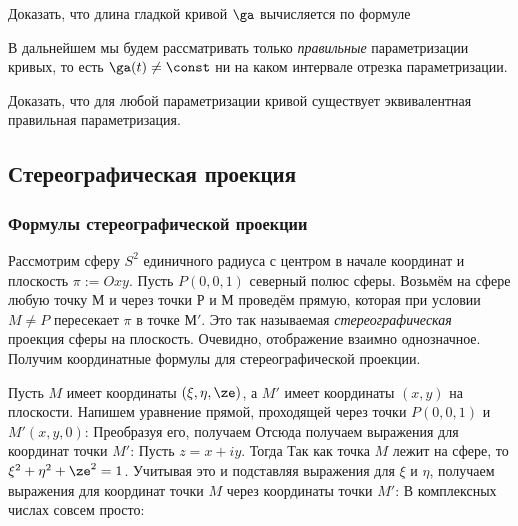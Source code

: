 \documentclass[a4paper]{article}
\begin{document}
\begin{problem}
Доказать, что длина гладкой кривой $\ga$ вычисляется по формуле
\end{problem}

\begin{note}
В дальнейшем мы будем рассматривать только \emph{правильные} параметризации кривых, то есть $\ga(t)\neq\const$ ни на
каком интервале отрезка параметризации.
\end{note}

\begin{problem}
Доказать, что для любой параметризации кривой существует эквивалентная правильная параметризация.
\end{problem}

\subsection{Стереографическая проекция}

\subsubsection{Формулы стереографической проекции}

Рассмотрим сферу $S^2$ единичного радиуса с центром в начале координат и плоскость $\pi := Oxy$.
Пусть $P(0,0,1)$ северный полюс сферы. Возьмём на сфере любую точку $М$ и через точки $Р$ и $М$
проведём прямую, которая при условии $M \neq P$ пересекает $\pi$ в точке $М'$. Это так называемая
\emph{стереографическая} проекция сферы на плоскость. Очевидно, отображение взаимно
однозначное. Получим координатные формулы для стереографической проекции.

Пусть $M$ имеет координаты $(\xi, \eta, \ze)$, а $M'$ имеет координаты $(x,y)$ на плоскости.
Напишем уравнение прямой, проходящей через точки $P(0,0,1)$ и $M'(x,y,0)$:
Преобразуя его, получаем
Отсюда получаем выражения для координат точки $M'$:
Пусть $z=x+iy$. Тогда
Так как точка $M$ лежит на сфере, то $\xi^2+\eta^2+\ze^2=1$. Учитывая это и подставляя
выражения для $\xi$ и $\eta$, получаем выражения для координат точки $M$ через координаты точки $M'$:
В комплексных числах совсем просто:
\end{document}
